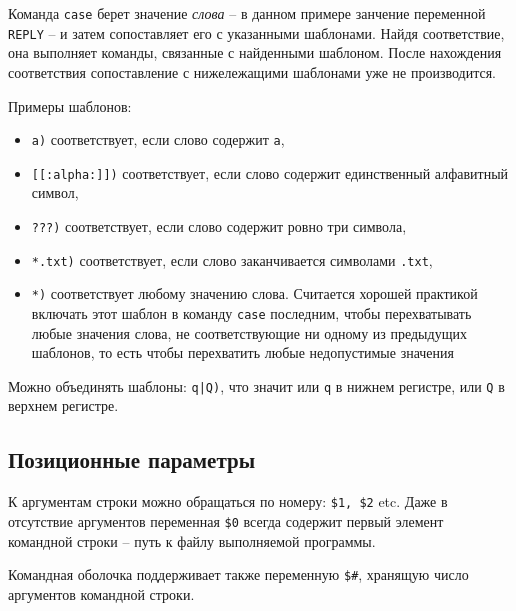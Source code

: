 \documentclass[%
	11pt,
	a4paper,
	utf8,
		]{article}
\begin{document}
Команда \texttt{case} берет значение \emph{слова} -- в данном примере занчение переменной \texttt{REPLY} -- и затем сопоставляет его с указанными шаблонами. Найдя соответствие, она выполняет команды, связанные с найденными шаблоном. После нахождения соответствия сопоставление с нижележащими шаблонами уже не производится.

Примеры шаблонов:
\begin{itemize}
	\item \verb|a)| соответствует, если слово содержит \texttt{a},
	
	\item \verb|[[:alpha:]])| соответствует, если слово содержит единственный алфавитный символ,
	
	\item \verb|???)| соответствует, если слово содержит ровно три символа,
	
	\item \verb|*.txt)| соответствует, если слово заканчивается символами \texttt{.txt},
	
	\item \verb|*)| соответствует любому значению слова. Считается хорошей практикой включать этот шаблон в команду \texttt{case} последним, чтобы перехватывать любые значения слова, не соответствующие ни одному из предыдущих шаблонов, то есть чтобы перехватить любые недопустимые значения
\end{itemize}

Можно объединять шаблоны: \lstinline[basicstyle=\ttfamily\fontsize{10pt}{10pt}]{q|Q)}, что значит или \texttt{q} в нижнем регистре, или \texttt{Q} в верхнем регистре.

\subsection{Позиционные параметры}

К аргументам строки можно обращаться по номеру: \verb|$1, $2| etc. Даже в отсутствие аргументов переменная \verb|$0| всегда содержит первый элемент командной строки -- путь к файлу выполняемой программы.


Командная оболочка поддерживает также переменную \verb|$#|, хранящую число аргументов командной строки.
\end{document}

